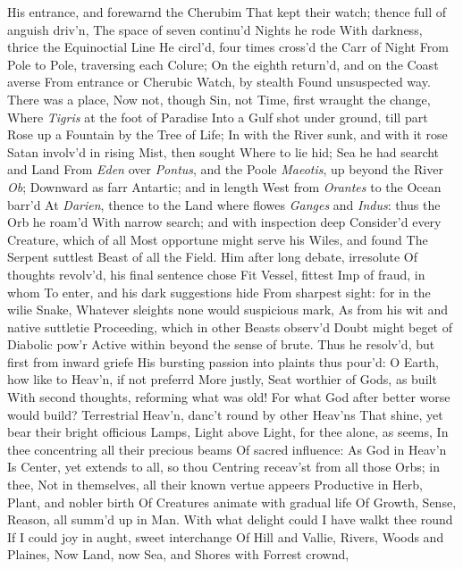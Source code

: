 \documentclass[11pt]{book}
\newcounter {first}
\begin{document}
His entrance, and forewarnd the Cherubim 
That kept their watch; thence full of anguish driv'n, 
The space of seven continu'd Nights he rode 
With darkness, thrice the Equinoctial Line 
He circl'd, four times cross'd the Carr of Night 
From Pole to Pole, traversing each Colure; 
On the eighth return'd, and on the Coast averse 
From entrance or Cherubic Watch, by stealth 
Found unsuspected way.  There was a place, 
Now not, though Sin, not Time, first wraught the change, 
Where \textit{Tigris} at the foot of Paradise 
Into a Gulf shot under ground, till part 
Rose up a Fountain by the Tree of Life; 
In with the River sunk, and with it rose 
Satan involv'd in rising Mist, then sought 
Where to lie hid; Sea he had searcht and Land 
From \textit{Eden} over \textit{Pontus}, and the Poole 
\textit{Maeotis}, up beyond the River \textit{Ob}; 
Downward as farr Antartic; and in length 
West from \textit{Orantes} to the Ocean barr'd 
At \textit{Darien}, thence to the Land where flowes 
\textit{Ganges} and \textit{Indus}: thus the Orb he roam'd 
With narrow search; and with inspection deep 
Consider'd every Creature, which of all 
Most opportune might serve his Wiles, and found 
The Serpent suttlest Beast of all the Field. 
Him after long debate, irresolute 
Of thoughts revolv'd, his final sentence chose 
Fit Vessel, fittest Imp of fraud, in whom 
To enter, and his dark suggestions hide 
From sharpest sight: for in the wilie Snake, 
Whatever sleights none would suspicious mark, 
As from his wit and native suttletie 
Proceeding, which in other Beasts observ'd 
Doubt might beget of Diabolic pow'r 
Active within beyond the sense of brute. 
Thus he resolv'd, but first from inward griefe 
His bursting passion into plaints thus pour'd: 
\quad O Earth, how like to Heav'n, if not preferrd 
More justly, Seat worthier of Gods, as built 
With second thoughts, reforming what was old! 
For what God after better worse would build? 
Terrestrial Heav'n, danc't round by other Heav'ns 
That shine, yet bear their bright officious Lamps, 
Light above Light, for thee alone, as seems, 
In thee concentring all their precious beams 
Of sacred influence: As God in Heav'n 
Is Center, yet extends to all, so thou 
Centring receav'st from all those Orbs; in thee, 
Not in themselves, all their known vertue appeers 
Productive in Herb, Plant, and nobler birth 
Of Creatures animate with gradual life 
Of Growth, Sense, Reason, all summ'd up in Man. 
With what delight could I have walkt thee round 
If I could joy in aught, sweet interchange 
Of Hill and Vallie, Rivers, Woods and Plaines, 
Now Land, now Sea, and Shores with Forrest crownd, 
\end{document}
